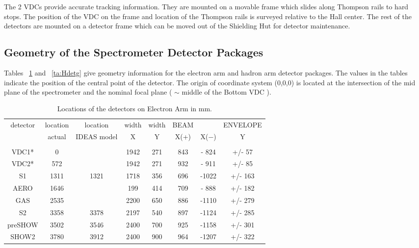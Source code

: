 The 2 VDCs provide accurate tracking information. They are
mounted on a movable frame which slides 
along Thompson rails to hard stops. 
The position of the VDC on the frame and location of the 
Thompson rails is surveyed relative to the Hall center. The
rest of the detectors are mounted 
on a detector frame which can be moved out of the Shielding Hut
for detector maintenance.   

\subsection{Geometry of the Spectrometer Detector Packages}

Tables ~\ref{ta:Edetg} and ~\ref{ta:Hdetg} give geometry
information for the electron arm and hadron arm detector packages. 
The values in the tables
indicate the position of the central point of the detector.
The origin of coordinate system (0,0,0) is located at the intersection of 
the mid plane of the spectrometer and the nominal focal
plane ( $\sim$ middle of the Bottom VDC ).

\begin{table}[hptb]
\begin{center}
\begin{tabular}{cccccccc}
detector&location&  location& width &   width &      BEAM  &        & ENVELOPE \\
        & actual &IDEAS model&   X  &     Y   &      X(+)&  X($-$) &   Y\\  \hline
       &        &          &        &         &          &         &           \\  \hline    
VDC1*   &      0 &          &   1942 &    271  &     843    & - 824  & +/-  57  \\
VDC2*   &     572&          &   1942 &    271  &     932    & - 911  & +/-  85  \\
S1      &    1311&     1321 &   1718 &    356  &     696    & -1022  & +/- 163  \\ 
AERO    &    1646&          &   199  &    414  &     709    & - 888  & +/- 182  \\
GAS     &    2535&          &   2200 &    650  &     886    & -1110  & +/- 279  \\ 
S2      &    3358&     3378 &   2197 &    540  &     897    & -1124  & +/- 285  \\
preSHOW &    3502&     3546 &   2400 &    700  &     925    & -1158  & +/- 301  \\ 
SHOW2   &    3780&     3912 &   2400 &    900  &     964    & -1207  & +/- 322  \\  \hline
\end{tabular}
\end{center}
\caption[Detectors: Electron ARM Detector Locations]{Locations of
the detectors on Electron Arm in mm.}
\label{ta:Edetg}
\end{table}

